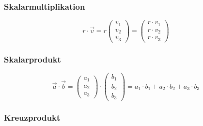 \subsubsection{Skalarmultiplikation}
\label{ssub:skalarmultiplikation}

\begin{equation}
	r \cdot \overrightarrow{v} = r \left( \begin{array}{c} v_1\\v_2\\v_3\end{array}\right)
	= \left( \begin{array}{c}r \cdot v_1\\r \cdot v_2\\r \cdot v_3\end{array}\right)
\end{equation}

\subsubsection{Skalarprodukt} 
\label{ssub:skalarprodukt}

\begin{equation}
	\overrightarrow{a} \cdot \overrightarrow{b}
	= \left( \begin{array}{c} a_1\\a_2\\a_3\end{array}\right) \cdot \left( \begin{array}{c} b_1\\b_2\\b_3\end{array}\right)
	= a_1 \cdot b_1 + a_2 \cdot b_2 + a_3 \cdot b_3
\end{equation}

\subsubsection{Kreuzprodukt}
\label{ssub:kreuzprodukt}


